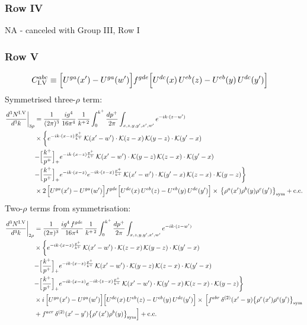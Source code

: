 \documentclass[9pt]{article}
\numberwithin{equation}{section}
\begin{document}
\subsubsection*{Row IV}
\textsc{NA} - canceled with Group III, Row I
\subsubsection*{Row V}
\begin{align}
C^{abc}_{{\rm I.V}}&\equiv \Big[U^{ga}(x')-U^{ga}(w')\Big]f^{gde}\Big[U^{dc}(x)\,U^{eb}(z)-U^{eb}(y)\,U^{dc}(y')\Big]\notag
\end{align}
Symmetrised three-$\rho$ term:
\begin{align}
\frac{d^{3}N^{\rm I.V}}{d^{3}k}\bigg|_{3\rho}&=\frac{1}{(2\pi)^{3}}\,\frac{ig^{4}}{16\pi^{4}}\,\frac{1}{k^{+\,2}}\int_{0}^{k^{+}}\frac{dp^{+}}{2\pi}\int_{x,z,y,y',x',w'}e^{-ik\cdot{(z-w')}}\notag\\
&\times\bigg\{e^{-ik\cdot{(x-z)}\frac{p^{+}}{k^{+}}}\,\mathcal{K}(x'-w')\cdot\mathcal{K}(z-x)\,\mathcal{K}(y-z)\cdot\mathcal{K}(y'-x)\notag\\
&{-\Big[\frac{k^{+}}{p^{+}}\Big]_{+}e^{-ik\cdot{(x-z)}\frac{p^{+}}{k^{+}}}\,\mathcal{K}(x'-w')\cdot\mathcal{K}(y-z)\,\mathcal{K}(z-x)\cdot\mathcal{K}(y'-x)}\notag\\
&{-\Big[\frac{k^{+}}{p^{+}}\Big]_{+}e^{-ik\cdot{(x-z)}}e^{-ik\cdot{(z-x)}\frac{p^{+}}{k^{+}}}\,\mathcal{K}(x'-w')\cdot\mathcal{K}(y'-x)\,\mathcal{K}(z-x)\cdot\mathcal{K}(y-z)}\bigg\}\notag\\
&\times 2\,\Big[U^{ga}(x')-U^{ga}(w')\Big]f^{gde}\Big[U^{dc}(x)\,U^{eb}(z)-U^{eb}(y)\,U^{dc}(y')\Big]\times\,\big\{\rho^{a}(x')\rho^{b}(y)\rho^{c}(y')\big\}_{\rm sym}+{\rm c.c.}\label{eq:D-I.V-3}
\end{align}
Two-$\rho$ terms from symmetrisation:
\begin{align}
\frac{d^{3}N^{\rm I.V}}{d^{3}k}\bigg|_{2\rho}&=\frac{1}{(2\pi)^{3}}\,\frac{ig^{4}\,f^{gde}}{16\pi^{4}}\,\frac{1}{k^{+\,2}}\int_{0}^{k^{+}}\frac{dp^{+}}{2\pi}\int_{x,z,y,y',x',w'}e^{-ik\cdot{(z-w')}}\notag\\
&\times\bigg\{e^{-ik\cdot{(x-z)}\frac{p^{+}}{k^{+}}}\,\mathcal{K}(x'-w')\cdot\mathcal{K}(z-x)\,\mathcal{K}(y-z)\cdot\mathcal{K}(y'-x)\notag\\
&{-\Big[\frac{k^{+}}{p^{+}}\Big]_{+}e^{-ik\cdot{(x-z)}\frac{p^{+}}{k^{+}}}\,\mathcal{K}(x'-w')\cdot\mathcal{K}(y-z)\,\mathcal{K}(z-x)\cdot\mathcal{K}(y'-x)}\notag\\
&{-\Big[\frac{k^{+}}{p^{+}}\Big]_{+}e^{-ik\cdot{(x-z)}}e^{-ik\cdot{(z-x)}\frac{p^{+}}{k^{+}}}\,\mathcal{K}(x'-w')\cdot\mathcal{K}(y'-x)\,\mathcal{K}(z-x)\cdot\mathcal{K}(y-z)}\bigg\}\notag\\
&\times i\,\Big[U^{ga}(x')-U^{ga}(w')\Big]\Big[U^{dc}(x)\,U^{eb}(z)-U^{eb}(y)\,U^{dc}(y')\Big]\times\,\Big[f^{abr}\,\delta^{(2)}(x'-y)\big\{\rho^{r}(x')\rho^{c}(y')\big\}_{\rm sym}\notag\\
& +f^{acr}\,\delta^{(2)}(x'-y')\big\{\rho^{r}(x')\rho^{b}(y)\big\}_{\rm sym}\Big]+{\rm c.c.}\label{eq:D-I.V-2}
\end{align}
\end{document}
